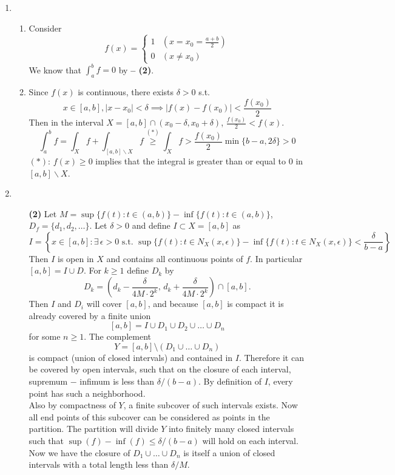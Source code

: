 \documentclass[11pt]{report}
\newcommand{\abs}[1]{\left|#1\right|}
\newcommand{\imp}{\implies}
\newcommand{\bs}{\backslash}
\begin{document}
\begin{enumerate}
\item 
\begin{enumerate}
	\item Consider
	$$f(x) = \begin{cases}
		1 & (x = x_0 = \frac{a+b}{2}) \\ 0 & (x \neq x_0)
	\end{cases}$$
	We know that $\int_a^b f = 0$ by \textbf{ -- (2)}.
	\item Since $f(x)$ is continuous, there exists $\delta > 0$ s.t. $$x\in [a, b], \abs{x- x_0} <\delta \imp \abs{f(x)-f(x_0)} < \frac{f(x_0)}{2}$$
	Then in the interval $X = [a, b]\cap (x_0-\delta, x_0+ \delta)$, $\frac{f(x_0)}{2} < f(x)$.
	$$\int_a^b f = \int_X f + \int_{[a, b]\bs X} f \overset{(*)}{\geq}\int_X f > \frac{f(x_0)}{2} \min\{b-a, 2\delta\} > 0$$
	$(*)$: $f(x) \geq 0$ implies that the integral is greater than or equal to 0 in $[a, b]\bs X$. 
\end{enumerate}
\item 
\begin{enumerate}
	\item[\textbf{\sffamily (2)}] 
	Let $M = \sup\{f(t): t\in (a, b)\} - \inf\{f(t): t\in (a, b)\}$, $D_f = \{d_1, d_2, \dots \}$.  Let $\delta > 0$ and define $I \subset X=[a,b]$ as $$I = \left\{ x \in [a,b] : \exists\,\epsilon > 0 \text{ s.t. }\sup\{f(t): t\in N_X(x, \epsilon)\} - \inf\{f(t): t\in N_X(x, \epsilon)\} < \frac{\delta}{b-a}  \right\}$$  Then $I$ is open in $X$ and contains all continuous points of $f$. In particular $[a,b] = I \cup D$. For $k \geq 1$ define $D_k$ by $$D_k = \left(d_k-\frac{\delta}{4M\cdot 2^{k}}, \, d_k+\frac{\delta}{4M\cdot 2^{k}} \right) \cap [a,b].$$  Then $I$ and $D_i$ will cover $[a,b]$, and because $[a,b]$ is compact it is already covered by a finite union $$[a,b] = I \cup D_1 \cup D_2 \cup \dots \cup D_n$$ for some $n \geq 1$.  The complement $$Y = [a,b] \setminus (D_1 \cup \dots \cup D_n)$$ is compact (union of closed intervals) and contained in $I$. Therefore it can be covered by open intervals, such that on the closure of each interval, supremum $-$ infimum is less than $\delta/(b-a)$. By definition of $I$, every point has such a neighborhood.\\
	Also by compactness of $Y$, a finite subcover of such intervals exists. Now all end points of this subcover can be considered as points in the partition. The partition will divide $Y$ into finitely many closed intervals such that $\sup(f) - \inf(f) \leq \delta/(b-a)$ will hold on each interval.  Now we have the closure of $D_1 \cup \dots \cup D_n$ is itself a union of closed intervals with a total length less than $\delta/M$.
	

\end{enumerate}
\end{enumerate}
\end{document}

